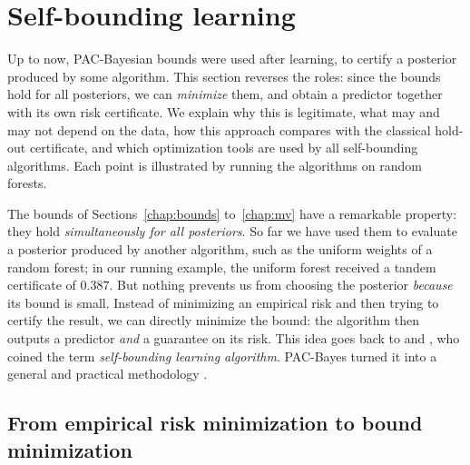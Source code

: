 \section{Self-bounding learning}
\label{chap:selfbounding}

\begin{objectives}
Up to now, PAC-Bayesian bounds were used after learning, to certify a posterior
produced by some algorithm. This section reverses the roles: since the bounds
hold for all posteriors, we can \emph{minimize} them, and obtain a predictor
together with its own risk certificate. We explain why this is legitimate, what
may and may not depend on the data, how this approach compares with the
classical hold-out certificate, and which optimization tools are used by all
self-bounding algorithms. Each point is illustrated by running the algorithms on
random forests.
\end{objectives}

The bounds of Sections~\ref{chap:bounds} to~\ref{chap:mv} have a remarkable
property: they hold \emph{simultaneously for all posteriors}. So far we have
used them to evaluate a posterior produced by another algorithm, such as the
uniform weights of a random forest; in our running example, the uniform
forest received a tandem certificate of $0.387$. But nothing prevents us from choosing the
posterior \emph{because} its bound is small. Instead of minimizing an empirical
risk and then trying to certify the result, we can directly minimize the bound:
the algorithm then outputs a predictor \emph{and} a guarantee on its risk. This
idea goes back to \citet{freund1998self} and \citet{langford2003microchoice}, who
coined the term \emph{self-bounding learning algorithm}. PAC-Bayes turned it
into a general and practical methodology
\citep{germain2009pac,germain2015risk,thiemann2017strongly,masegosa2020second,viallard2021self,perez2021tighter}.

\subsection{From empirical risk minimization to bound minimization}

